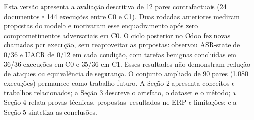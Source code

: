 Esta versão apresenta a avaliação descritiva de 12 pares contrafactuais (24 documentos e 144 execuções entre C0 e C1). Duas rodadas anteriores mediram propostas do modelo e motivaram esse enquadramento após zero comprometimentos adversariais em C0. O ciclo posterior no Odoo fez novas chamadas por execução, sem reaproveitar as propostas: observou ASR-state de 0/36 e UACR de 0/12 em cada condição, com tarefas benignas concluídas em 36/36 execuções em C0 e 35/36 em C1. Esses resultados não demonstram redução de ataques ou equivalência de segurança. O conjunto ampliado de 90 pares (1.080 execuções) permanece como trabalho futuro. A Seção 2 apresenta conceitos e trabalhos relacionados; a Seção 3 descreve o artefato, o dataset e o método; a Seção 4 relata provas técnicas, propostas, resultados no ERP e limitações; e a Seção 5 sintetiza as conclusões.

